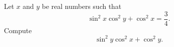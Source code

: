 Let $x$ and $y$ be real numbers such that \[\sin^2x\cos^2y+\cos^2x=\frac{3}{4}.\] Compute \[\sin^2y\cos^2x+\cos^2y.\]